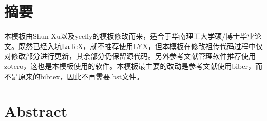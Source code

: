 \chapter{摘\texorpdfstring{\quad}{}要}
	本模板由Shun Xu\cite{_}以及yecfly\cite{_a}的模板修改而来，适合于华南理工大学硕/博士毕业论文。既然已经入坑LaTeX，就不推荐使用LYX，但本模板在修改祖传代码过程中仅对修改部分进行更新，其余部分仍保留源代码。另外参考文献管理软件推荐使用zotero，这也是本模板使用的软件。本模板最主要的改动是参考文献使用biber，而不是原来的bibtex，因此不再需要.bst文件。


\chapter{Abstract}
	


